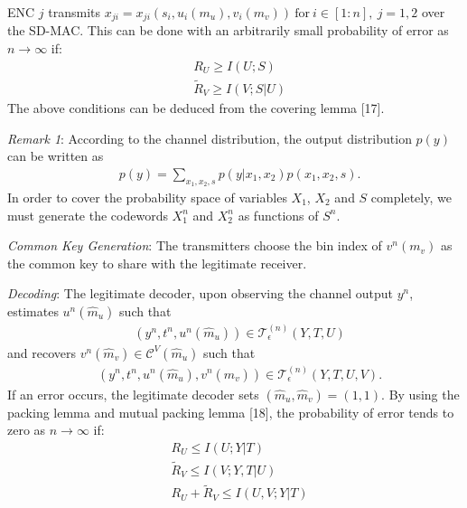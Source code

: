 \documentclass[conference,8pt]{IEEEtran}
\begin{document}
{{{{ENC $j$ transmits $x_{ji}=x_{ji}(s_i,u_i(m_u),v_i(m_v)) \ \text{for} \ i \in {[1:n]}, \ j=1,2$ over the SD-MAC. This can be done with an arbitrarily small probability of error as $n \to \infty$ if:
\begin{align}
&R_U \geq I(U;S) \\
&\tilde{R}_V \geq I(V;S|U)
\end{align}
The above conditions can be deduced from the covering lemma [17].


\emph{Remark 1}: According to the channel distribution, the output distribution $p(y)$ can be written as
\begin{align}
&p(y)= \sum_{x_1,x_2,s} p(y|x_1,x_2)p(x_1,x_2,s). \nonumber
\end{align}
In order to cover the probability space of variables $X_1$, $X_2 $ and $S$ completely, we must generate the codewords $X^n_{1}$ and $X^n_{2}$ as functions of $S^n$.


\emph{Common Key Generation}: The transmitters choose the bin index of $ v^n(m_v)$ as the common key to share with the legitimate receiver.


\emph{Decoding}: The legitimate decoder, upon observing the channel output $ y^n$, estimates $u^n(\hat{m}_u)$ such that
\begin{align}
&(y^n,t^n,u^n(\hat{m}_u)) \in \mathcal{T}^{(n)}_{\epsilon}(Y,T,U)
\end{align}
and recovers $v^n(\hat{m}_v) \in \mathcal{C}^V(\hat{m}_u)$ such that
\begin{align}
&(y^n,t^n,u^n(\hat{m}_u),v^n(\hat{m}_v)) \in \mathcal{T}^{(n)}_{\epsilon}(Y,T,U,V).
\end{align}
If an error occurs, the legitimate decoder sets $(\hat{m}_u,\hat{m}_v)=(1,1)$. By using the packing lemma and mutual packing lemma [18], the probability of error tends to zero as $n \to \infty$ if:
\begin{align}
&R_U \leq I(U;Y|T) \\ 
&\tilde{R}_V \leq I(V;Y,T|U)  \\
&R_U + \tilde{R}_V \leq I(U,V;Y|T) 
\end{align}


}}}}
\end{document}
